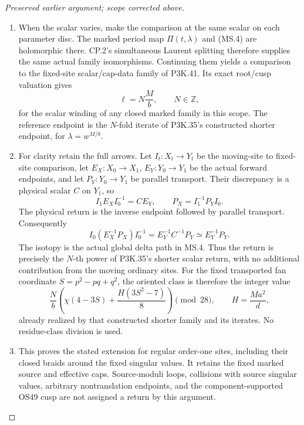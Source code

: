 \begin{proof}[Preserved earlier argument; scope corrected above]
\begin{enumerate}[label=\arabic*.]
\par\nobreak

\item When the scalar varies, make the comparison at the same scalar on
each parameter disc. The marked period map \(\Pi(t,\lambda)\)
and (MS.4) are holomorphic there. CP.2's simultaneous Laurent splitting
therefore supplies the same actual family isomorphisms. Continuing
them yields a comparison to the fixed-site scalar/cap-data family of
P3K.41. Its exact root/cusp valuation gives
\[
                     \ell=N\frac{M}{b},\qquad N\in\mathbb Z,
                                                               \tag{MS.9}
\]
for the scalar winding of any closed marked family in this scope.
The reference endpoint is the \(N\)-fold iterate of P3K.35's
constructed shorter endpoint, for \(\lambda=w^{M/b}\).

\item For clarity retain the full arrows. Let \(I_t:X_t\to Y_t\)
be the moving-site to fixed-site comparison, let
\(E_X:X_0\to X_1\), \(E_Y:Y_0\to Y_1\) be the actual
forward endpoints, and let \(P_Y:Y_0\to Y_1\) be parallel
transport. Their discrepancy is a physical scalar \(C\) on
\(Y_1\), so
\[
 I_1E_XI_0^{-1}=C E_Y,\qquad
 P_X=I_1^{-1}P_YI_0.
\]
The physical return is the inverse endpoint followed by parallel
transport. Consequently
\[
 I_0(E_X^{-1}P_X)I_0^{-1}
       =E_Y^{-1}C^{-1}P_Y
       \simeq E_Y^{-1}P_Y.                                \tag{MS.10}
\]
The isotopy is the actual global delta path in MS.4. Thus the return
is precisely the \(N\)-th power of P3K.35's shorter scalar return,
with no additional contribution from the moving ordinary sites.
For the fixed transported fan coordinate \(S=p^2-pq+q^2\), the
oriented class is therefore the integer value
\[
 \frac{N}{b}\left(\chi(4-3S)+\frac{H(3S^2-7)}8\right)
            \pmod {28},\qquad H=\frac{Ma^2}{d},           \tag{MS.11}
\]
already realized by that constructed shorter family and its iterates.
No residue-class division is used.

\item This proves the stated extension for regular order-one sites, including
their closed braids around the fixed singular values. It retains the
fixed marked source and effective caps. Source-moduli loops,
collisions with source singular values, arbitrary nontranslation
endpoints, and the component-supported OS49 cusp are not assigned a
return by this argument.

\end{enumerate}
\end{proof}